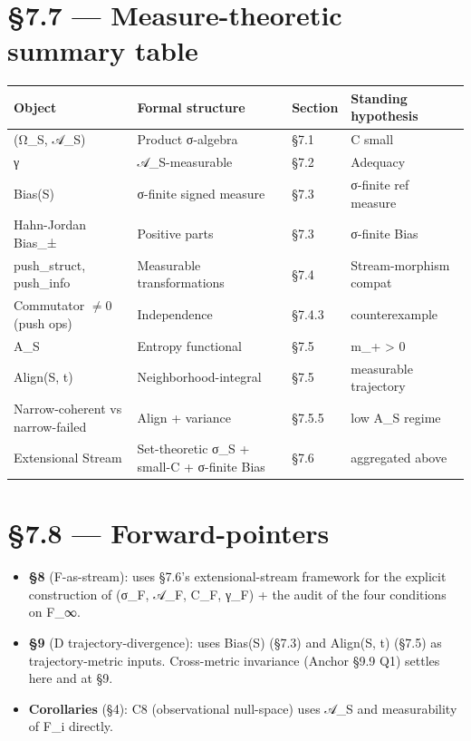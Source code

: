 \documentclass[11pt, openany]{book}
\newcommand{\sectionbreak}{\clearpage}
\begin{document}
\sectionbreak

\section{§7.7 --- Measure-theoretic summary table}

\begingroup\setlength{\tabcolsep}{3pt}\renewcommand{\arraystretch}{1.15}\footnotesize
\begin{longtable}{p{1.23in} p{1.65in} p{0.56in} p{0.84in}}
\toprule
Object & Formal structure & Section & Standing hypothesis \\
\midrule
\endhead
\bottomrule
\endfoot
(Ω\_\allowbreak{}S, 𝒜\_\allowbreak{}S) & Product σ-algebra & §7.1 & C small \\
\midrule
γ & 𝒜\_\allowbreak{}S-measurable & §7.2 & Adequacy \\
\midrule
Bias(S) & σ-finite signed measure & §7.3 & σ-finite ref measure \\
\midrule
Hahn-Jordan Bias\_\allowbreak{}± & Positive parts & §7.3 & σ-finite Bias \\
\midrule
push\_\allowbreak{}struct, push\_\allowbreak{}info & Measurable transformations & §7.4 & Stream-morphism compat \\
\midrule
Commutator $\neq 0$ (push ops) & Independence & §7.4.3 & counterexample \\
\midrule
A\_\allowbreak{}S & Entropy functional & §7.5 & m\_\allowbreak{}+ > 0 \\
\midrule
Align(S, t) & Neighborhood-integral & §7.5 & measurable trajectory \\
\midrule
Narrow-coherent vs narrow-failed & Align + variance & §7.5.5 & low A\_\allowbreak{}S regime \\
\midrule
Extensional Stream & Set-theoretic σ\_\allowbreak{}S + small-C + σ-finite Bias & §7.6 & aggregated above \\
\bottomrule
\end{longtable}
\endgroup
\sectionbreak

\section{§7.8 --- Forward-pointers}

\begin{itemize}
\item \textbf{§8} (F-as-stream): uses §7.6's extensional-stream framework for the explicit construction of (σ\_\allowbreak{}F, 𝒜\_\allowbreak{}F, C\_\allowbreak{}F, γ\_\allowbreak{}F) + the audit of the four conditions on F\_\allowbreak{}∞.
\item \textbf{§9} (D trajectory-divergence): uses Bias(S) (§7.3) and Align(S, t) (§7.5) as trajectory-metric inputs. Cross-metric invariance (Anchor §9.9 Q1) settles here and at §9.
\item \textbf{Corollaries} (§4): C8 (observational null-space) uses 𝒜\_\allowbreak{}S and measurability of F\_\allowbreak{}i directly.
\end{itemize}
\end{document}
